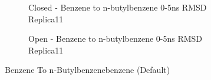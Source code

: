 \documentclass[T4paper.tex]{subfiles}
\begin{document}
\begin{figure}
\begin{subfigure}{\textwidth}
   \centering
   \caption{Closed - Benzene to n-butylbenzene 0-5ns RMSD Replica11}
   \label{fig:c_exp_opls3_11/RMSD-replica11}
\end{subfigure}
\centering
\begin{subfigure}{\textwidth}
  \centering
   \caption{Open - Benzene to n-butylbenzene 0-5ns RMSD Replica11}
   \label{fig:o_exp_opls3_24/RMSD-replica11}
\end{subfigure}%
\caption{Benzene To n-Butylbenzenebenzene (Default)}
\label{fig:benzene_to_n-butyl}
\end{figure}
\end{document}
